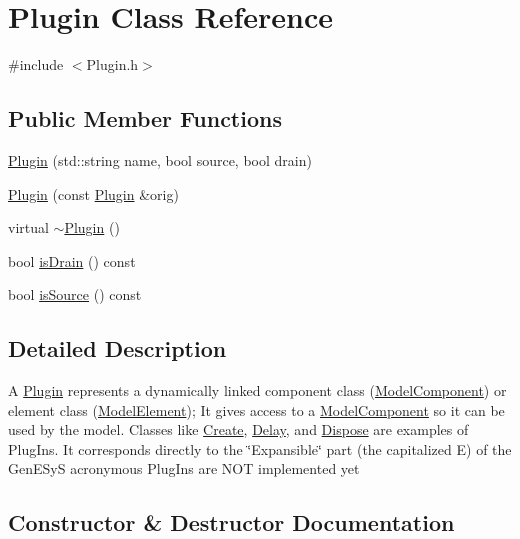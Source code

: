 \hypertarget{class_plugin}{}\section{Plugin Class Reference}
\label{class_plugin}


{\ttfamily \#include $<$Plugin.\+h$>$}

\subsection*{Public Member Functions}
\begin{DoxyCompactItemize}
\item 
\hyperlink{class_plugin_a1180a8be15f3a920f1044e528d807ea1}{Plugin} (std\+::string name, bool source, bool drain)
\item 
\hyperlink{class_plugin_acececc8908162c6b0c883e62995abad8}{Plugin} (const \hyperlink{class_plugin}{Plugin} \&orig)
\item 
virtual \hyperlink{class_plugin_aee4cc1864a2afa84a9ad935153f3fe39}{$\sim$\+Plugin} ()
\item 
bool \hyperlink{class_plugin_a1f1610d1eee7009dedf030f8495ab748}{is\+Drain} () const 
\item 
bool \hyperlink{class_plugin_a87ed4a6c7eab8e84a650c4e057f15dd1}{is\+Source} () const 
\end{DoxyCompactItemize}


\subsection{Detailed Description}
A \hyperlink{class_plugin}{Plugin} represents a dynamically linked component class (\hyperlink{class_model_component}{Model\+Component}) or element class (\hyperlink{class_model_element}{Model\+Element}); It gives access to a \hyperlink{class_model_component}{Model\+Component} so it can be used by the model. Classes like \hyperlink{class_create}{Create}, \hyperlink{class_delay}{Delay}, and \hyperlink{class_dispose}{Dispose} are examples of Plug\+Ins. It corresponds directly to the \char`\"{}\+Expansible\char`\"{} part (the capitalized \textquotesingle{}E\textquotesingle{}) of the Gen\+E\+SyS acronymous Plug\+Ins are N\+OT implemented yet 

\subsection{Constructor \& Destructor Documentation}
